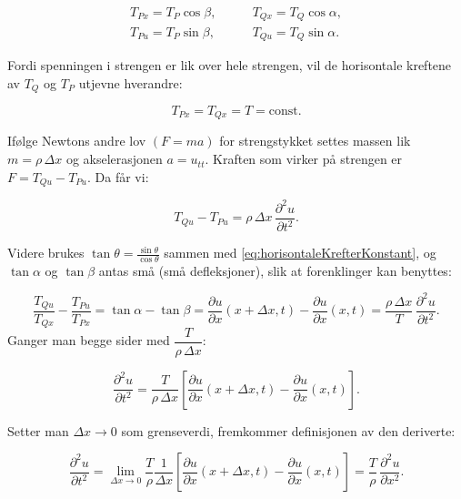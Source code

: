 \begin{align*}
  T_{Px} = T_P \cos\beta, &\qquad T_{Qx} = T_Q \cos\alpha,\\
  T_{Pu} = T_P \sin\beta, &\qquad T_{Qu} = T_Q \sin\alpha.
\end{align*}

Fordi spenningen i strengen er lik over hele strengen, vil de horisontale kreftene
av $T_Q$ og $T_P$ utjevne hverandre:

\begin{equation}
  T_{Px} = T_{Qx} = T = \text{const.}
  \label{eq:horisontaleKrefterKonstant}
\end{equation}

Ifølge Newtons andre lov $(F=ma)$ for strengstykket settes massen lik $m=\rho\,\Delta x$ og
akselerasjonen $a=u_{tt}$. Kraften som virker på strengen er $F=T_{Qu}-T_{Pu}$. Da får vi:

\begin{equation*}
  T_{Qu}-T_{Pu}=\rho\,\Delta x\,\frac{\partial^2 u}{\partial t^2}.
\end{equation*}

Videre brukes $\tan\theta=\frac{\sin\theta}{\cos\theta}$ sammen med \eqref{eq:horisontaleKrefterKonstant}, og
$\tan\alpha$ og $\tan\beta$ antas små (små defleksjoner), slik at forenklinger kan benyttes: 

\begin{equation}
  \frac{T_{Qu}}{T_{Qx}}-\frac{T_{Pu}}{T_{Px}}
  = \tan\alpha - \tan\beta
  = \frac{\partial u}{\partial x}(x+\Delta x,t)-\frac{\partial u}{\partial x}(x,t)
  = \frac{\rho\,\Delta x}{T}\,\frac{\partial^2 u}{\partial t^2}.
  \label{eq:krefterPaStykke}
\end{equation}
\clearpage
Ganger man begge sider med $\dfrac{T}{\rho\,\Delta x}$:

\begin{equation}
  \frac{\partial^2 u}{\partial t^2}
  = \frac{T}{\rho\,\Delta x}\left[
     \frac{\partial u}{\partial x}(x+\Delta x,t)-\frac{\partial u}{\partial x}(x,t)
    \right].
  \label{eq:tidPartiellDerivert}
\end{equation}

Setter man $\Delta x\to 0$ som grenseverdi, fremkommer definisjonen av den deriverte:

\begin{equation}
  \frac{\partial^2 u}{\partial t^2}
  = \lim_{\Delta x\to 0}\frac{T}{\rho}\frac{1}{\Delta x}
    \left[\frac{\partial u}{\partial x}(x+\Delta x,t)-\frac{\partial u}{\partial x}(x,t)\right]
  = \frac{T}{\rho}\,\frac{\partial^2 u}{\partial x^2}.
  \label{eq:deltaXGarMotNull}
\end{equation}

